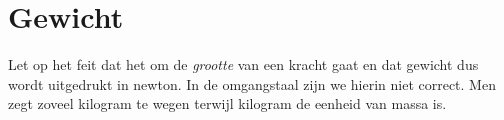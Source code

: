 \documentclass{ximera}
\begin{document}
	\author{Bart Lambregs}



	\section{Gewicht}

	
	
	
	Let op het feit dat het om de \textit{grootte} van een kracht gaat en dat gewicht dus wordt uitgedrukt in newton. In de omgangstaal zijn we hierin niet correct. Men zegt zoveel kilogram te wegen terwijl kilogram de eenheid van massa is.
	
	
	
	
\end{document}

